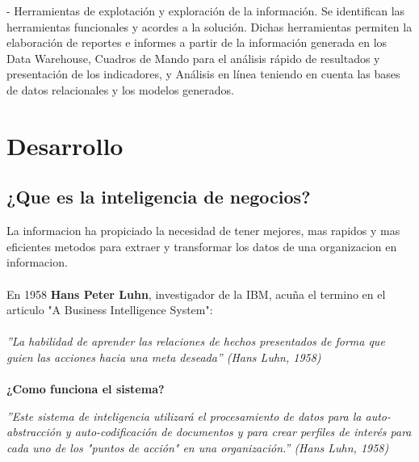 \documentclass[twoside,twocolumn]{article}
\begin{document}
\begin{itemize}
- Herramientas de explotación y exploración de la información. Se
identifican las herramientas funcionales y acordes a la solución. Dichas
herramientas permiten la elaboración de reportes e informes a partir de la
información generada en los Data Warehouse, Cuadros de Mando para el análisis
rápido de resultados y presentación de los indicadores, y Análisis en línea
teniendo en cuenta las bases de datos relacionales y los modelos generados. \\




\end{itemize}




\section{Desarrollo}

\subsection{¿Que es la inteligencia de negocios?}

La informacion ha propiciado la necesidad de tener mejores, mas rapidos y mas eficientes metodos para extraer y transformar los datos de una organizacion en informacion.
\\ \\
En 1958 \textbf{Hans Peter Luhn}, investigador de la IBM, acuña el termino en el articulo "A Business Intelligence System":
\\ \\
\textsl{''La habilidad de aprender las relaciones de hechos presentados de forma que guien las acciones hacia una meta deseada'' (Hans Luhn, 1958)} \\ \\

 \textbf{ ¿Como funciona el sistema?}

\textsl{''Este sistema de inteligencia utilizará el procesamiento de datos para la auto-abstracción y auto-codificación de documentos y para crear perfiles de interés para cada uno de los "puntos de acción" en una organización.'' (Hans Luhn, 1958)}
\\ \\
\end{document}
